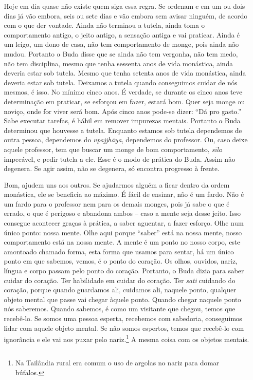 Hoje em dia quase não existe quem siga essa regra. Se ordenam e em
um ou dois dias já vão embora, seis ou sete dias e vão embora sem
avisar ninguém, de acordo com o que der vontade. Ainda não terminou a
tutela, ainda toma o comportamento antigo, o jeito antigo, a sensação
antiga e vai praticar. Ainda é um leigo, um dono de casa, não tem
comportamento de monge, pois ainda não mudou. Portanto o Buda disse que
se ainda não tem vergonha, não tem medo, não tem disciplina, mesmo que
tenha sessenta anos de vida monástica, ainda deveria estar sob tutela.
Mesmo que tenha setenta anos de vida monástica, ainda deveria estar sob
tutela. Deixamos a tutela quando conseguimos cuidar de nós mesmos, é
isso. No mínimo cinco anos. É verdade, se durante os cinco anos teve
determinação em praticar, se esforçou em fazer, estará bom. Quer seja
monge ou noviço, onde for viver será bom. Após cinco anos pode-se
dizer: “Dá pro gasto.” Sabe executar tarefas, é hábil em remover
impurezas mentais. Portanto o Buda determinou que houvesse a tutela.
Enquanto estamos sob tutela dependemos de outra pessoa, dependemos do
\textit{upajjhāya}, dependemos do professor. Ou, caso deixe aquele
professor, tem que buscar um monge de bom comportamento,
\textit{sīla} impecável, e pedir tutela a ele. Esse é o modo de
prática do Buda. Assim não degenera. Se agir assim, não se degenera, só
encontra progresso à frente. 

Bom, ajudem uns aos outros. Se ajudarmos alguém a ficar dentro da
ordem monástica, ele se beneficia ao máximo. É fácil de ensinar, não é
um fardo. Não é um fardo para o professor nem para os demais monges,
pois já sabe o que é errado, o que é perigoso e abandona ambos – caso a
mente seja desse jeito. Isso consegue acontecer graças à prática, a
saber aguentar, a fazer esforço. Olhe num único ponto: nossa mente.
Olhe aqui porque “saber” está na nossa mente, nosso comportamento está
na nossa mente. A mente é um ponto no nosso corpo, este amontoado
chamado forma, esta forma que usamos para sentar, há um único ponto em
que sabemos, vemos, é o ponto do coração. Os olhos, ouvidos, nariz,
língua e corpo passam pelo ponto do coração. Portanto, o Buda dizia
para saber cuidar do coração. Ter habilidade em cuidar do coração. Ter
\textit{sati} cuidando do coração, porque quando guardamos ali,
cuidamos ali, naquele ponto, qualquer objeto mental que passe vai
chegar àquele ponto. Quando chegar naquele ponto nós saberemos. Quando
sabemos, é como um visitante que chegou, temos que recebê-lo. Se somos
uma pessoa esperta, recebemos com sabedoria, conseguimos lidar com
aquele objeto mental. Se não somos espertos, temos que recebê-lo com
ignorância e ele vai nos puxar pelo nariz.\footnote{Na Tailândia rural
era comum o uso de argolas no nariz para domar búfalos.} A mesma coisa
com os objetos mentais. 


